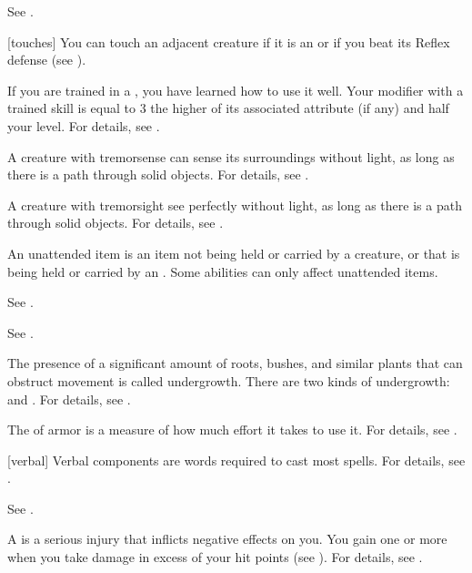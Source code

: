  See .

[touches] You can touch an adjacent creature if it is an  or if you beat its Reflex defense (see ).


 If you are trained in a , you have learned how to use it well.
Your modifier with a trained skill is equal to 3 \add the higher of its associated attribute (if any) and half your level.
For details, see .

 A creature with tremorsense can sense its surroundings without light, as long as there is a path through solid objects.
For details, see .

 A creature with tremorsight see perfectly without light, as long as there is a path through solid objects.
For details, see .

 An unattended item is an item not being held or carried by a creature, or that is being held or carried by an .
Some abilities can only affect unattended items.

 See .

 See .

 The presence of a significant amount of roots, bushes, and similar plants that can obstruct movement is called undergrowth.
There are two kinds of undergrowth:  and .
For details, see .

 The  of armor is a measure of how much effort it takes to use it.
For details, see .

[verbal] Verbal components are words required to cast most spells.
For details, see .

 See .

 A  is a serious injury that inflicts negative effects on you.
You gain one or more  when you take damage in excess of your hit points (see ).
For details, see .

